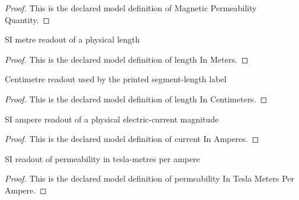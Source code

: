 \begin{proof}
  This is the declared model definition of Magnetic Permeability Quantity.
\end{proof}
\begin{definition}
  \label{def:physics:phyx-mini-0916:phyxminiproblems-problemphyxmini0916-lengthinmeters}
  SI metre readout of a physical length
\end{definition}
\begin{proof}
  This is the declared model definition of length In Meters.
\end{proof}
\begin{definition}
  \label{def:physics:phyx-mini-0916:phyxminiproblems-problemphyxmini0916-lengthincentimeters}
  Centimetre readout used by the printed segment-length label
\end{definition}
\begin{proof}
  This is the declared model definition of length In Centimeters.
\end{proof}
\begin{definition}
  \label{def:physics:phyx-mini-0916:phyxminiproblems-problemphyxmini0916-currentinamperes}
  SI ampere readout of a physical electric-current magnitude
\end{definition}
\begin{proof}
  This is the declared model definition of current In Amperes.
\end{proof}
\begin{definition}
  \label{def:physics:phyx-mini-0916:phyxminiproblems-problemphyxmini0916-permeabilityinteslametersperampere}
  SI readout of permeability in tesla-metres per ampere
\end{definition}
\begin{proof}
  This is the declared model definition of permeability In Tesla Meters Per Ampere.
\end{proof}
